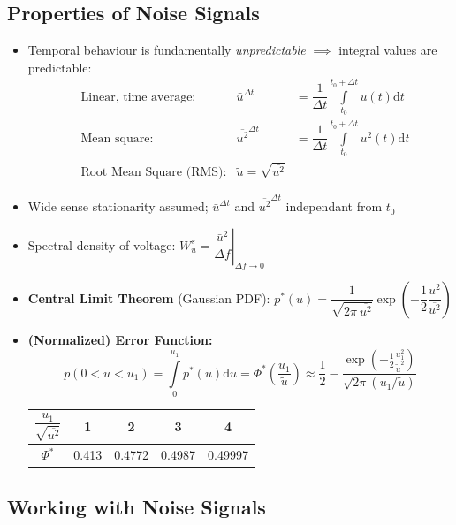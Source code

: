 \subsection{Properties of Noise Signals}
\begin{itemize}
    \item Temporal behaviour is fundamentally \textit{unpredictable} $\implies$ integral values are predictable:
        \begin{align*}
            &\text{Linear, time average:} &\bar{u}^{\Delta t} &= \dfrac{1}{\Delta t}\int\limits^{t_0+\Delta t}_{t_0} u(t) \mathrm{d}t\\
            &\text{Mean square:} &\overline{u^2}^{\Delta t} &= \dfrac{1}{\Delta t}\int\limits^{t_0+\Delta t}_{t_0} u^2(t) \mathrm{d}t\\
            &\text{Root Mean Square (RMS):} &\tilde{u}=\sqrt{\overline{u^2}}
        \end{align*}
    \item Wide sense stationarity assumed; $\bar{u}^{\Delta t}$ and $\overline{u^2}^{\Delta t}$ independant from $t_0$
    \item Spectral density of voltage: \(W_u^s = \left.\dfrac{\bar{u}^2}{\Delta f}\right|_{\Delta f \to 0}\)
    \item \textbf{Central Limit Theorem} (Gaussian PDF):
        \(p^*(u) = \dfrac{1}{\sqrt{2\pi\:\overline{u^2}}}\exp\left(- \dfrac{1}{2}\dfrac{u^2}{\overline{u^2}}\right)\)
    \item \textbf{(Normalized) Error Function:}
        \begin{equation*}
            p(0<u<u_1) = \int\limits_0^{u_1} p^*(u)\mathrm{d}u = \Phi^*\left(\dfrac{u_1}{\tilde{u}}\right) \approx \dfrac{1}{2} - \dfrac{\exp(-\frac{1}{2}\frac{u_1^2}{\tilde{u}^2})}{\sqrt{2\pi}(u_1/\tilde{u})}
        \end{equation*}
        \begin{tabular}{|c|c|c|c|c|}\hline
            $\dfrac{u_1}{\sqrt{\overline{u^2}}}$ & 1 & 2 & 3 & 4\\\hline
            $\Phi^*$ & 0.413 & 0.4772 & 0.4987 & 0.49997\\\hline
        \end{tabular}
\end{itemize}

\subsection{Working with Noise Signals}
